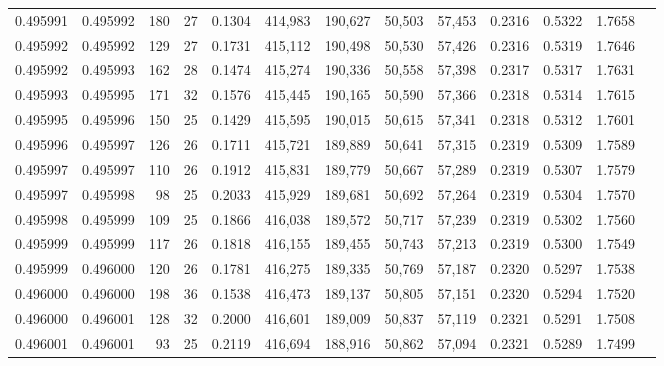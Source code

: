 \begin{tabular}{rrrrrrrrrrrrr}
0.495991 & 0.495992 & 180 &  27 &                                     0.1304 & 414,983 & 190,627 &  50,503 &  57,453 & 0.2316 & 0.5322 & 1.7658 \\
0.495992 & 0.495992 & 129 &  27 &                                     0.1731 & 415,112 & 190,498 &  50,530 &  57,426 & 0.2316 & 0.5319 & 1.7646 \\
0.495992 & 0.495993 & 162 &  28 &                                     0.1474 & 415,274 & 190,336 &  50,558 &  57,398 & 0.2317 & 0.5317 & 1.7631 \\
0.495993 & 0.495995 & 171 &  32 &                                     0.1576 & 415,445 & 190,165 &  50,590 &  57,366 & 0.2318 & 0.5314 & 1.7615 \\
0.495995 & 0.495996 & 150 &  25 &                                     0.1429 & 415,595 & 190,015 &  50,615 &  57,341 & 0.2318 & 0.5312 & 1.7601 \\
0.495996 & 0.495997 & 126 &  26 &                                     0.1711 & 415,721 & 189,889 &  50,641 &  57,315 & 0.2319 & 0.5309 & 1.7589 \\
0.495997 & 0.495997 & 110 &  26 &                                     0.1912 & 415,831 & 189,779 &  50,667 &  57,289 & 0.2319 & 0.5307 & 1.7579 \\
0.495997 & 0.495998 &  98 &  25 &                                     0.2033 & 415,929 & 189,681 &  50,692 &  57,264 & 0.2319 & 0.5304 & 1.7570 \\
0.495998 & 0.495999 & 109 &  25 &                                     0.1866 & 416,038 & 189,572 &  50,717 &  57,239 & 0.2319 & 0.5302 & 1.7560 \\
0.495999 & 0.495999 & 117 &  26 &                                     0.1818 & 416,155 & 189,455 &  50,743 &  57,213 & 0.2319 & 0.5300 & 1.7549 \\
0.495999 & 0.496000 & 120 &  26 &                                     0.1781 & 416,275 & 189,335 &  50,769 &  57,187 & 0.2320 & 0.5297 & 1.7538 \\
0.496000 & 0.496000 & 198 &  36 &                                     0.1538 & 416,473 & 189,137 &  50,805 &  57,151 & 0.2320 & 0.5294 & 1.7520 \\
0.496000 & 0.496001 & 128 &  32 &                                     0.2000 & 416,601 & 189,009 &  50,837 &  57,119 & 0.2321 & 0.5291 & 1.7508 \\
0.496001 & 0.496001 &  93 &  25 &                                     0.2119 & 416,694 & 188,916 &  50,862 &  57,094 & 0.2321 & 0.5289 & 1.7499 \\

\end{tabular}

